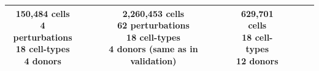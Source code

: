 \documentclass[11pt]{article}
\begin{document}
\begin{table}[htb]
{\begin{tabular}{cccccc}
    \shortstack[c]{150,484 cells\\4 perturbations\\18 cell-types\\4 donors} &
    \shortstack[c]{2,260,453 cells\\62 perturbations\\18 cell-types\\4 donors (same as in validation)} &
    \shortstack[c]{629,701 cells\\18 cell-types\\12 donors} \\
    \bottomrule
  \end{tabular}
  }
\end{table}


\end{document}
